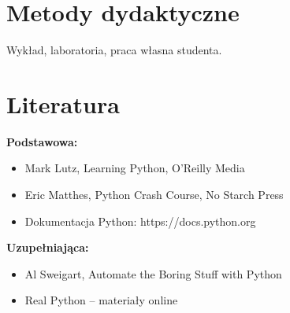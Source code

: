\documentclass[12pt, a4paper]{article}
\begin{document}
\section{Metody dydaktyczne}

Wykład, laboratoria, praca własna studenta.

\section{Literatura}

\textbf{Podstawowa:}
\begin{itemize}
  \item Mark Lutz, Learning Python, O'Reilly Media
  \item Eric Matthes, Python Crash Course, No Starch Press
  \item Dokumentacja Python: https://docs.python.org
\end{itemize}

\textbf{Uzupełniająca:}
\begin{itemize}
  \item Al Sweigart, Automate the Boring Stuff with Python
  \item Real Python – materiały online
\end{itemize}
\end{document}
